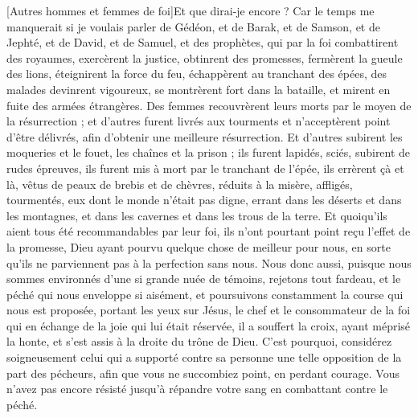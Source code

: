\begin{multicols}{2}
[Autres hommes et femmes de foi]Et que dirai-je encore ? Car le temps me manquerait si je voulais parler de Gédéon, et de Barak, et de Samson, et de Jephté, et de David, et de Samuel, et des prophètes,
qui par la foi combattirent des royaumes, exercèrent la justice, obtinrent des promesses, fermèrent la gueule des lions,
éteignirent la force du feu, échappèrent au tranchant des épées, des malades devinrent vigoureux, se montrèrent fort dans la bataille, et mirent en fuite des armées étrangères.
Des femmes recouvrèrent leurs morts par le moyen de la résurrection ; et d'autres furent livrés aux tourments et n'acceptèrent point d'être délivrés, afin d'obtenir une meilleure résurrection.
Et d'autres subirent les moqueries et le fouet, les chaînes et la prison ;
ils furent lapidés, sciés, subirent de rudes épreuves, ils furent mis à mort par le tranchant de l'épée, ils errèrent çà et là, vêtus de peaux de brebis et de chèvres, réduits à la misère, affligés, tourmentés,
eux dont le monde n'était pas digne, errant dans les déserts et dans les montagnes, et dans les cavernes et dans les trous de la terre.
 Et quoiqu'ils aient tous été recommandables par leur foi, ils n'ont pourtant point reçu l'effet de  la promesse,
Dieu ayant pourvu quelque chose de meilleur pour nous, en sorte qu'ils ne parviennent pas à la perfection sans nous.
\VerseOne{}Nous donc aussi, puisque nous sommes environnés d'une si grande nuée de témoins, rejetons tout fardeau, et le péché qui nous enveloppe si aisément, et poursuivons constamment la course qui nous est proposée,
portant les yeux sur Jésus, le chef et le consommateur de la foi qui en échange de la joie qui lui était réservée, il a souffert la croix, ayant méprisé la honte, et s'est assis à la droite du trône de Dieu.
C'est pourquoi, considérez soigneusement celui qui a supporté contre sa personne une telle opposition de la part des pécheurs, afin que vous ne succombiez point, en perdant courage.
Vous n'avez pas encore résisté jusqu'à répandre votre sang en combattant contre le péché.

\end{multicols}
